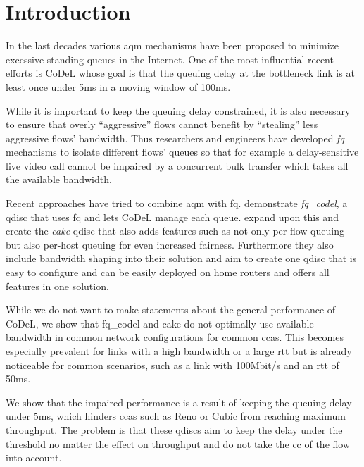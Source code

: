 \documentclass[10pt,sigconf,letterpaper,dvipsnames\ifx\removeHeaders\tempYes ,nonacm\fi]{acmart}
\begin{document}
\newcommand{\codel}{CoDeL}

\maketitle

\section{Introduction}

In the last decades various \gls{aqm} mechanisms have been proposed to minimize excessive standing queues in the Internet. One of the most influential recent efforts is \codel{} \cite{nichols_controlling_2012} whose goal is that the queuing delay at the bottleneck link is at least once under 5\;ms in a moving window of 100\;ms. 

While it is important to keep the queuing delay constrained, it is also necessary to ensure that overly ``aggressive'' flows cannot benefit by ``stealing'' less aggressive flows' bandwidth. Thus researchers and engineers have developed \textit{\gls{fq}} mechanisms \cite{shreedhar_efficient_1996,dumazet_pkt_sched:_2013} to isolate different flows' queues so that for example a delay-sensitive live video call cannot be impaired by a concurrent bulk transfer which takes all the available bandwidth. 

Recent approaches have tried to combine \gls{aqm} with \gls{fq}. \cite{taht_flow_2018} demonstrate \textit{fq\_codel}, a \gls{qdisc} that uses \gls{fq} and lets \codel{} manage each queue. \cite{hoiland-jorgensen_piece_2018} expand upon this and create the \textit{cake} \gls{qdisc} that also adds features such as not only per-flow queuing but also per-host queuing for even increased fairness. Furthermore they also include bandwidth shaping into their solution and aim to create one \gls{qdisc} that is easy to configure and can be easily deployed on home routers and offers all features in one solution. 

While we do not want to make statements about the general performance of \codel{}, we show that fq\_codel and cake do not optimally use available bandwidth in common network configurations for common \glspl{cca}. This becomes especially prevalent for links with a high bandwidth or a large \gls{rtt} but is already noticeable for common scenarios, such as a link with 100\;Mbit/s and an \gls{rtt} of 50\;ms. 

We show that the impaired performance is a result of keeping the queuing delay under 5\;ms, which hinders \glspl{cca} such as Reno or Cubic from reaching maximum throughput. The problem is that these \glspl{qdisc} aim to keep the delay under the threshold no matter the effect on throughput and do not take the \gls{cc} of the flow into account. 
\end{document}
